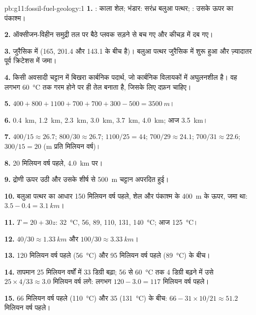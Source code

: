 \begin{solution}{pb:g11:fossil-fuel-geology:1}
\textbf{1.} : काला शेल; भंडार: सरंध्र बलुआ पत्थर;
: उसके ऊपर का पंकाश्म।

\textbf{2.} ऑक्सीजन-विहीन समुद्री तल पर बैठे प्लवक सड़ने से बच गए
और कीचड़ में दब गए।

\textbf{3.}  जुरैसिक में (165, 201.4 और
143.1 के बीच है)। बलुआ पत्थर जुरैसिक में शुरू हुआ और ज़्यादातर
पूर्व क्रिटेशस में जमा।

\textbf{4.} किसी अवसादी चट्टान में बिखरा कार्बनिक पदार्थ, जो
कार्बनिक विलायकों में अघुलनशील है। वह लगभग
\qty{60}{\degreeCelsius} तक गरम होने पर ही तेल बनाता है, जिसके लिए दफ़न चाहिए।

\textbf{5.} $400 + 800 + 1100 + 700 + 700 + 300 - 500 = \qty{3500}{m}$।

\textbf{6.} \qty{0.4}{km}, \qty{1.2}{km}, \qty{2.3}{km}, \qty{3.0}{km},
\qty{3.7}{km}, \qty{4.0}{km}; आज \qty{3.5}{km}।

\textbf{7.} $400/15 \approx 26.7$; $800/30 \approx 26.7$; $1100/25 = 44$;
$700/29 \approx 24.1$; $700/31 \approx 22.6$; $300/15 = 20$ (\unit{m} प्रति
मिलियन वर्ष)।

\textbf{8.} 20 मिलियन वर्ष पहले, \qty{4.0}{km} पर।

\textbf{9.} द्रोणी ऊपर उठी और उसके शीर्ष से \qty{500}{m} चट्टान
अपरदित हुई।

\textbf{10.} बलुआ पत्थर का आधार 150 मिलियन वर्ष पहले, शेल और पंकाश्म के
\qty{400}{m} के ऊपर, जमा था: $3.5 - 0.4 = \qty{3.1}{km}$।

\textbf{11.} $T = 20 + 30 z$: \qty{32}{\degreeCelsius}, \num{56}, \num{89},
\num{110}, \num{131}, \qty{140}{\degreeCelsius}; आज
\qty{125}{\degreeCelsius}।

\textbf{12.} $40/30 \approx \qty{1.33}{km}$ और $100/30 \approx
\qty{3.33}{km}$।

\textbf{13.} 120 मिलियन वर्ष पहले (\qty{56}{\degreeCelsius}) और
95 मिलियन वर्ष पहले (\qty{89}{\degreeCelsius}) के बीच।

\textbf{14.} तापमान 25 मिलियन वर्षों में 33 डिग्री बढ़ा;
\num{56} से \qty{60}{\degreeCelsius} तक 4 डिग्री बढ़ने में उसे $25 \times 4/33 \approx 3.0$ मिलियन वर्ष लगे: लगभग $120 - 3.0 = 117$ मिलियन वर्ष
पहले।

\textbf{15.} 66 मिलियन वर्ष पहले (\qty{110}{\degreeCelsius}) और
35 (\qty{131}{\degreeCelsius}) के बीच: $66 - 31 \times 10/21 \approx 51.2$ मिलियन
वर्ष पहले।


\end{solution}
